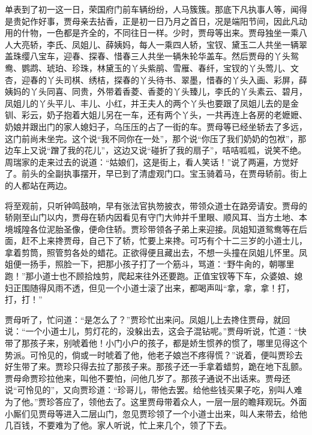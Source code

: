 \documentclass[12pt,oneside]{book}
\begin{document}
单表到了初一这一日，荣国府门前车辆纷纷，人马簇簇。那底下凡执事人等，闻得是贵妃作好事，贾母亲去拈香，正是初一日乃月之首日，况是端阳节间，因此凡动用的什物，一色都是齐全的，不同往日一样。少时，贾母等出来。贾母独坐一乘八人大亮轿，李氏、凤姐儿、薛姨妈，每人一乘四人轿，宝钗、黛玉二人共坐一辆翠盖珠缨八宝车，迎春、探春、惜春三人共坐一辆朱轮华盖车。然后贾母的丫头鸳鸯、鹦鹉、琥珀、珍珠，林黛玉的丫头紫鹃、雪雁、春纤，宝钗的丫头莺儿、文杏，迎春的丫头司棋、绣桔，探春的丫头待书、翠墨，惜春的丫头入画、彩屏，薛姨妈的丫头同喜、同贵，外带着香菱、香菱的丫头臻儿，李氏的丫头素云、碧月，凤姐儿的丫头平儿、丰儿、小红，并王夫人的两个丫头也要跟了凤姐儿去的是金钏、彩云，奶子抱着大姐儿另在一车，还有两个丫头，一共再连上各房的老嬷嬷、奶娘并跟出门的家人媳妇子，乌压压的占了一街的车。贾母等已经坐轿去了多远，这门前尚未坐完。这个说“我不同你在一处”，那个说“你压了我们奶奶的包袱”，那边车上又说“蹭了我的花儿”，这边又说“碰折了我的扇子”，咭咭呱呱，说笑不绝。周瑞家的走来过去的说道：“姑娘们，这是街上，看人笑话！”说了两遍，方觉好了。前头的全副执事摆开，早已到了清虚观门口。宝玉骑着马，在贾母轿前。街上的人都站在两边。

将至观前，只听钟鸣鼓响，早有张法官执笏披衣，带领众道士在路旁请安。贾母的轿刚至山门以内，贾母在轿内因看见有守门大帅并千里眼、顺风耳、当方土地、本境城隍各位泥胎圣像，便命住轿。贾珍带领各子弟上来迎接。凤姐知道鸳鸯等在后面，赶不上来搀贾母，自己下了轿，忙要上来搀。可巧有个十二三岁的小道士儿，拿着剪筒，照管剪各处的蜡花。正欲得便且藏出去，不想一头撞在凤姐儿怀里。凤姐便一扬手，照脸一下，把那小孩子打了一个筋斗，骂道：“野牛肏的，朝哪里跑！”那小道士也不顾拾烛剪，爬起来往外还要跑。正值宝钗等下车，众婆娘、媳妇正围随得风雨不透，但见一个小道士滚了出来，都喝声叫“拿，拿，拿！打，打，打！”

贾母听了，忙问道：“是怎么了？”贾珍忙出来问。凤姐儿上去搀住贾母，就回说：“一个小道士儿，剪灯花的，没躲出去，这会子混钻呢。”贾母听说，忙道：“快带了那孩子来，别唬着他！小门小户的孩子，都是娇生惯养的惯了，哪里见得这个势派。可怜见的，倘或一时唬着了他，他老子娘岂不疼得慌？”说着，便叫贾珍去好生带了来。贾珍只得去拉了那孩子来。那孩子还一手拿着蜡剪，跪在地下乱颤。贾母命贾珍拉他来，叫他不要怕，问他几岁了。那孩子通说不出话来。贾母还说“可怜见的”，又向贾珍道：“珍哥儿，带他去罢。给他些钱买果子吃，别叫人难为了他。”贾珍答应了，领他去了。这里贾母带着众人，一层一层的瞻拜观玩。外面小厮们见贾母等进入二层山门，忽见贾珍领了一个小道士出来，叫人来带去，给他几百钱，不要难为了他。家人听说，忙上来几个，领了下去。
\end{document}
